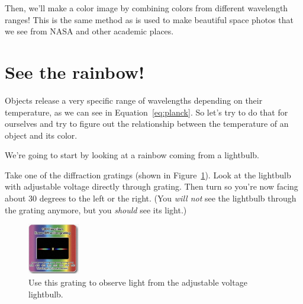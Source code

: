 Then, we'll make a color image by combining colors from different wavelength
ranges!  This is the same method as is used to make beautiful space photos that
we see from NASA and other academic places.

\section{See the rainbow!}
\label{sec:diffraction}
Objects release a very specific range of wavelengths depending on their
temperature, as we can see in Equation~\ref{eq:planck}.
So let's try to do that for ourselves and try to figure out the relationship
between the temperature of an object and its color.

We're going to start by looking at a rainbow coming from a lightbulb. 
\begin{steps}
\item Take one of the diffraction gratings (shown in Figure~\ref{fig:grating}).
Look at the lightbulb with adjustable voltage directly through grating. Then
turn so you're now facing about 30 degrees to the left or the right. (You
\emph{will not} see the lightbulb through the grating anymore, but you
\emph{should} see its light.) 
\end{steps}

\noindent
{}
\hspace{0.3cm}
\vspace{0.2cm}
\begin{minipage}{0.5\textwidth}
\end{minipage}

\begin{figure}
\label{fig:grating}
       \centering
       \includegraphics[width=0.2\textwidth]{inventing-color/diffraction.png}
       \caption{Use this grating to observe light from the adjustable voltage lightbulb.}
\end{figure}

